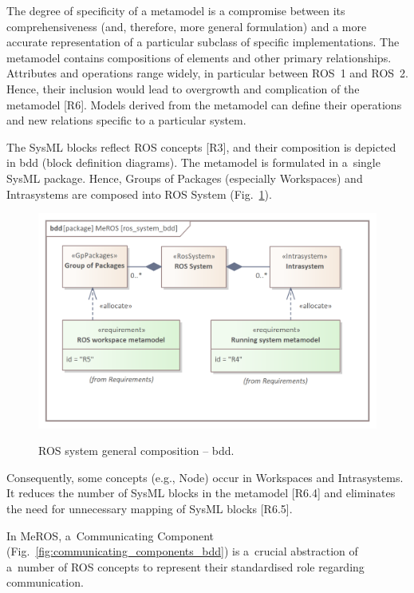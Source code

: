 The degree of specificity of a metamodel is a compromise between its comprehensiveness (and, therefore, more general formulation) and a more accurate representation of a particular subclass of specific implementations. The metamodel contains compositions of elements and other primary relationships. Attributes and operations range widely, in particular between ROS~1 and ROS~2. Hence, their inclusion would lead to overgrowth and complication of the metamodel [R6]. Models derived from the metamodel can define their operations and new relations specific to a particular system.

The SysML blocks reflect ROS concepts [R3], and their composition is depicted in bdd (block definition diagrams). The metamodel is formulated in a~single SysML package. Hence, Groups of Packages (especially Workspaces) and Intrasystems are composed into ROS System (Fig.~\ref{fig:ros_system_bdd}).


\begin{figure}[H]
    \centering
    \begin{center}
    {\includegraphics[scale=1.1]{../imgs/meros_pkg/ros_system_bdd.png}}
    \end{center}
    \caption{ROS system general composition -- bdd.}
    \label{fig:ros_system_bdd}
\end{figure}

Consequently, some concepts (e.g., Node) occur in Workspaces and Intrasystems. It reduces the number of SysML blocks in the metamodel [R6.4] and eliminates the need for unnecessary mapping of SysML blocks [R6.5].

\pagebreak

In MeROS, a~Communicating Component (Fig.~\ref{fig:communicating_components_bdd}) is a~crucial abstraction of a~number of ROS concepts to represent their standardised role regarding communication.



